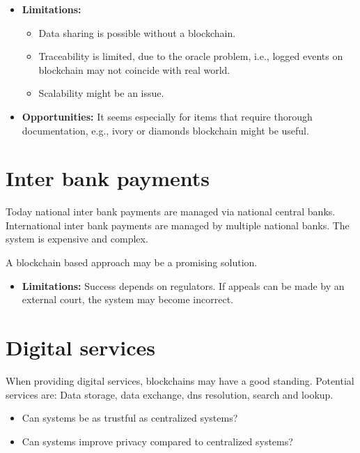 \begin{itemize}
	\item[] \textbf{Limitations:}
	\begin{itemize}	
	\item Data sharing is possible without a blockchain.
	\item Traceability is limited, due to the oracle problem, i.e., logged events on blockchain may not coincide with real world.
	\item Scalability might be an issue.
	\end{itemize}
	\item[] \textbf{Opportunities:}
	It seems especially for items that require thorough documentation, e.g., ivory or diamonds blockchain might be useful.
\end{itemize}

\section{Inter bank payments}
Today national inter bank payments are managed via national central banks.
International inter bank payments are managed by multiple national banks.
The system is expensive and complex.

A blockchain based approach may be a promising solution.

\begin{itemize}
	\item[] \textbf{Limitations:}
	Success depends on regulators. If appeals can be made by an external court, the system may become incorrect.
\end{itemize}

\section{Digital services}
When providing digital services, blockchains may have a good standing. Potential services are: Data storage, data exchange, dns resolution, search and lookup.

\begin{itemize}
	\item Can systems be as trustful as centralized systems?
	\item Can systems improve privacy compared to centralized systems?
\end{itemize}

